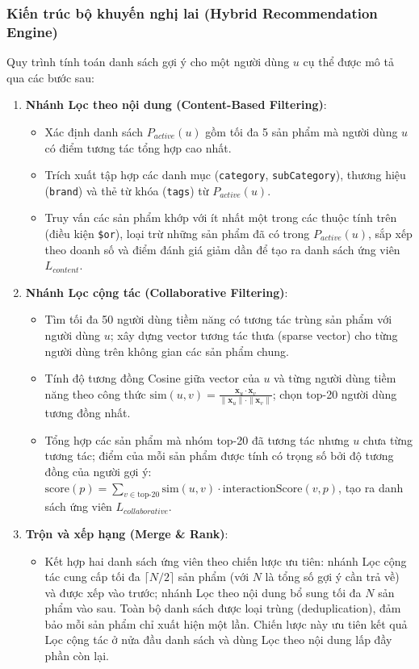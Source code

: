 \documentclass[../DoAn.tex]{subfiles}
\begin{document}
\subsubsection{Kiến trúc bộ khuyến nghị lai (Hybrid Recommendation Engine)}
Quy trình tính toán danh sách gợi ý cho một người dùng $u$ cụ thể được mô tả qua các bước sau:
\begin{enumerate}
    \item \textbf{Nhánh Lọc theo nội dung (Content-Based Filtering)}:
        \begin{itemize}
            \item Xác định danh sách $P_{active}(u)$ gồm tối đa 5 sản phẩm mà người dùng $u$ có điểm tương tác tổng hợp cao nhất.
            \item Trích xuất tập hợp các danh mục (\texttt{category}, \texttt{subCategory}), thương hiệu (\texttt{brand}) và thẻ từ khóa (\texttt{tags}) từ $P_{active}(u)$.
            \item Truy vấn các sản phẩm khớp với ít nhất một trong các thuộc tính trên (điều kiện \texttt{\$or}), loại trừ những sản phẩm đã có trong $P_{active}(u)$, sắp xếp theo doanh số và điểm đánh giá giảm dần để tạo ra danh sách ứng viên $L_{content}$.
        \end{itemize}
    \item \textbf{Nhánh Lọc cộng tác (Collaborative Filtering)}:
        \begin{itemize}
            \item Tìm tối đa 50 người dùng tiềm năng có tương tác trùng sản phẩm với người dùng $u$; xây dựng vector tương tác thưa (sparse vector) cho từng người dùng trên không gian các sản phẩm chung.
            \item Tính độ tương đồng Cosine giữa vector của $u$ và từng người dùng tiềm năng theo công thức $\text{sim}(u,v) = \frac{\mathbf{x}_u \cdot \mathbf{x}_v}{\|\mathbf{x}_u\| \cdot \|\mathbf{x}_v\|}$; chọn top-20 người dùng tương đồng nhất.
            \item Tổng hợp các sản phẩm mà nhóm top-20 đã tương tác nhưng $u$ chưa từng tương tác; điểm của mỗi sản phẩm được tính có trọng số bởi độ tương đồng của người gợi ý: $\text{score}(p) = \sum_{v \in \text{top-}20} \text{sim}(u,v) \cdot \text{interactionScore}(v, p)$, tạo ra danh sách ứng viên $L_{collaborative}$.
        \end{itemize}
    \item \textbf{Trộn và xếp hạng (Merge \& Rank)}:
        \begin{itemize}
            \item Kết hợp hai danh sách ứng viên theo chiến lược ưu tiên: nhánh Lọc cộng tác cung cấp tối đa $\lceil N/2 \rceil$ sản phẩm (với $N$ là tổng số gợi ý cần trả về) và được xếp vào trước; nhánh Lọc theo nội dung bổ sung tối đa $N$ sản phẩm vào sau. Toàn bộ danh sách được loại trùng (deduplication), đảm bảo mỗi sản phẩm chỉ xuất hiện một lần. Chiến lược này ưu tiên kết quả Lọc cộng tác ở nửa đầu danh sách và dùng Lọc theo nội dung lấp đầy phần còn lại.

\end{itemize}
\end{enumerate}
\end{document}

